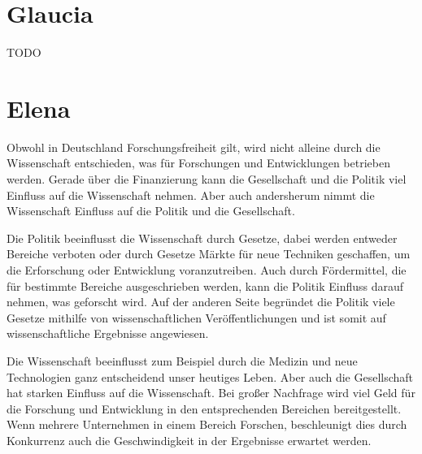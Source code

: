 \documentclass{pmwk}
\begin{document}
\nocite{01,02,03,04,05,06}


\Abgabeblatt{}{}{}{}




\section*{Glaucia}
TODO

\section*{Elena}
Obwohl in Deutschland Forschungsfreiheit gilt, wird nicht alleine durch die Wissenschaft entschieden, was für Forschungen und Entwicklungen betrieben werden. Gerade über die Finanzierung kann die Gesellschaft und die Politik viel Einfluss auf die Wissenschaft nehmen. Aber auch andersherum nimmt die Wissenschaft Einfluss auf die Politik und die Gesellschaft. \par
Die Politik beeinflusst die Wissenschaft durch Gesetze, dabei werden entweder Bereiche verboten oder durch Gesetze Märkte für neue Techniken geschaffen, um die Erforschung oder Entwicklung voranzutreiben. Auch durch Fördermittel, die für bestimmte Bereiche ausgeschrieben werden, kann die Politik Einfluss darauf nehmen, was geforscht wird. Auf der anderen Seite begründet die Politik viele Gesetze mithilfe von wissenschaftlichen Veröffentlichungen und ist somit auf wissenschaftliche Ergebnisse angewiesen. \par
Die Wissenschaft beeinflusst zum Beispiel durch die Medizin und neue Technologien ganz entscheidend unser heutiges Leben. Aber auch die Gesellschaft hat starken Einfluss auf die Wissenschaft. Bei großer Nachfrage wird viel Geld für die Forschung und Entwicklung in den entsprechenden Bereichen bereitgestellt. Wenn mehrere Unternehmen in einem Bereich Forschen, beschleunigt dies durch Konkurrenz auch die Geschwindigkeit in der Ergebnisse erwartet werden. 
\end{document}
